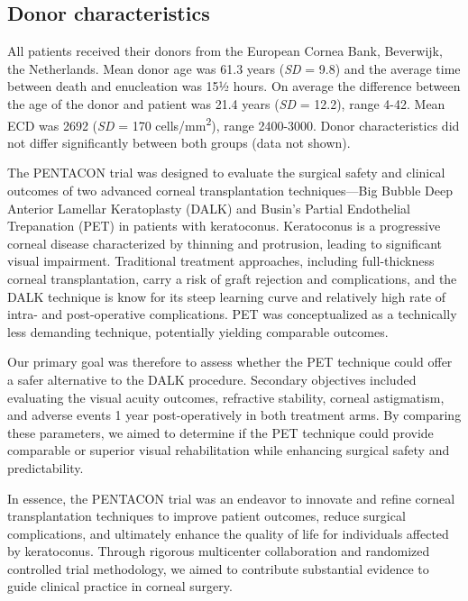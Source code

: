 \documentclass[authordate, empirical,issue]{jote-new-article}
\begin{document}
	\subsection{Donor characteristics}



	All patients received their donors from the European Cornea Bank, Beverwijk, the Netherlands. Mean donor age was 61.3 years (\emph{SD }=\emph{ }9.8) and the average time between death and enucleation was 15½ hours. On average the difference between the age of the donor and patient was 21.4 years (\emph{SD }=\emph{ }12.2), range 4-42. Mean ECD was 2692 (\emph{SD }=\emph{ }170 cells/mm\textsuperscript{2}), range 2400-3000. Donor characteristics did not differ significantly between both groups (data not shown).

	
	
	\begin{originalPurpose}
		The PENTACON trial was designed to evaluate the surgical safety and clinical outcomes of two advanced corneal transplantation techniques—Big Bubble Deep Anterior Lamellar Keratoplasty (DALK) and Busin's Partial Endothelial Trepanation (PET) in patients with keratoconus. Keratoconus is a progressive corneal disease characterized by thinning and protrusion, leading to significant visual impairment. Traditional treatment approaches, including full-thickness corneal transplantation, carry a risk of graft rejection and complications, and the DALK technique is know for its steep learning curve and relatively high rate of intra- and post-operative complications. PET was conceptualized as a technically less demanding technique, potentially yielding comparable outcomes.
	
		Our primary goal was therefore to assess whether the PET technique could offer a safer alternative to the DALK procedure. Secondary objectives included evaluating the visual acuity outcomes, refractive stability, corneal astigmatism, and adverse events 1 year post-operatively in both treatment arms. By comparing these parameters, we aimed to determine if the PET technique could provide comparable or superior visual rehabilitation while enhancing surgical safety and predictability.

		In essence, the PENTACON trial was an endeavor to innovate and refine corneal transplantation techniques to improve patient outcomes, reduce surgical complications, and ultimately enhance the quality of life for individuals affected by keratoconus. Through rigorous multicenter collaboration and randomized controlled trial methodology, we aimed to contribute substantial evidence to guide clinical practice in corneal surgery.
	\end{originalPurpose}
\end{document}
